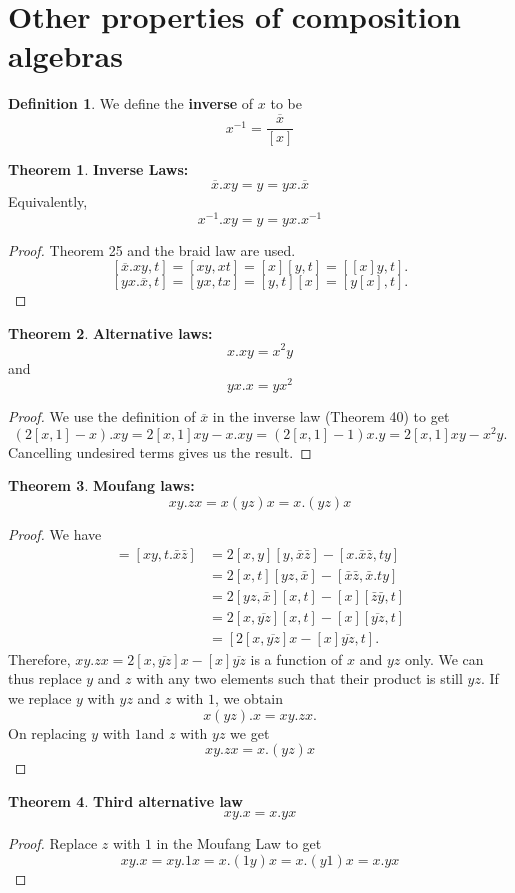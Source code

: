 \documentclass[11pt]{report}
\theoremstyle{plain}
\theoremstyle{definition}
\newtheorem{defn}{Definition}
\newtheorem{theorem}{Theorem}
\begin{document}
\section{Other properties of composition algebras}
\begin{defn}We define the \textbf{inverse} of $ x$ to be 
	$$ x ^ {-1} = \frac{\overline{x} }{[x] } $$
\end{defn}
\begin{theorem}
	\textbf{ Inverse Laws: }
	$$\overline{x}.xy = y = yx.\overline{x}$$
Equivalently, 
	$$x^{-1}.xy = y = yx.x^{-1}$$
\end{theorem}
\begin{proof}
	Theorem 25 and the braid law are used. 
	$$ [\overline{x}.xy,t] = [xy,xt] = [x][y,t] = [[x]y,t].$$
	$$ [yx.\overline{x},t] = [yx,tx] = [y,t][x] = [y[x],t].$$
\end{proof}
\begin{theorem}
	\textbf{ Alternative laws: }
	$$x.xy = x^2 y$$ 
	and 
	$$yx.x = yx^2 $$
\end{theorem}
\begin{proof}
	We use the definition of $ \overline{x} $ in the inverse law (Theorem 40) to get
	$$ (2[x,1]-x).xy = 2[x,1]xy - x.xy  = (2[x,1]-1)x.y = 2[x,1]xy-x^2y.$$
	Cancelling undesired terms gives us the result.
\end{proof}
\begin{theorem}
	\textbf{ Moufang laws: }
	$$xy.zx = x(yz)x = x.(yz)x$$ 
\end{theorem}
\begin{proof}
We have 
\begin{align*}
[xy.zx,t] = [xy,t.\bar{x}\bar{z}]&= 2[x,y][y,\bar{x}\bar{z}] - [x.\bar{x}\bar{z},ty]\\
&=2[x,t][yz,\bar{x}] - [\bar{x}\bar{z}, \bar{x}.ty]\\
&=2[yz,\bar{x}][x,t] - [x][\bar{z}\bar{y},t]\\
&=2[x,\overline{yz}][x,t] - [x][\overline{yz},t]\\
&=[2[x,\overline{yz}]x - [x]\overline{yz} ,t].
\end{align*}
Therefore, $ xy.zx = 2[x,\overline{yz}]x - [x]\overline{yz} $ is a function of $ x$ and $ yz $ only. We can thus replace $ y$ and $ z $ with any two elements such that their product is still $ yz. $ If we replace $ y $ with  $ yz $ and $ z $ with $ 1 $, we obtain $$x(yz).x = xy.zx.$$
On replacing $ y  $ with $ 1  $and $ z $ with $ yz $ we get $$ xy.zx = x.(yz)x$$ 
\end{proof}
\begin{theorem}
		\textbf{ Third alternative law }
		$$xy.x = x.yx $$
\end{theorem}
\begin{proof}
	Replace $ z $ with $ 1 $ in the Moufang Law to get
	$$xy.x = xy.1x = x.(1y)x = x.(y1)x = x.yx $$
\end{proof}
\end{document}
